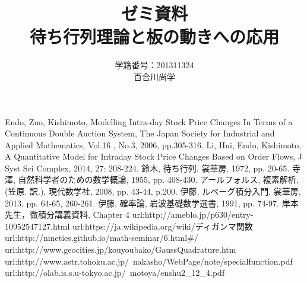 \documentclass[a4j,papersize,disablejfam,slide,14pt]{jsarticle}
\begin{document}
\title{\Huge ゼミ資料\\待ち行列理論と板の動きへの応用}
\author{\Large 学籍番号：201311324\\百合川尚学}
\maketitle

\tableofcontents

\begin{thebibliography}{9}
         {\rm Endo, Zuo, Kishimoto, 
        Modelling Intra-day Stock Price Changes In Terms of
        a Continuous Double Auction System, 
        The Japan Society for Industrial and Applied Mathematics, 
        Vol.16 , No.3, 2006, pp.305-316.}
         {\rm Li, Hui, Endo, Kishimoto, A Quantitative Model for Intraday Stock Price
         Changes Based on Order Flows, 
         J Syst Sci Complex, 2014, 27: 208-224.}
         {\rm 鈴木, 待ち行列, 裳華房, 1972, pp. 20-65.}
         {\rm 寺澤, 自然科学者のための数学概論, 1955, pp. 408-430.}
         {\rm アールフォルス, 複素解析, (笠原. 訳.), 現代数学社, 2008, pp. 43-44, p.200.}
         {\rm 伊藤, ルベーグ積分入門, 裳華房, 2013, pp. 64-65, 260-261.}
         {\rm 伊藤, 確率論, 岩波基礎数学選書, 1991, pp. 74-97.}
         {\rm 岸本先生，微積分講義資料, Chapter 4}
         {\rm url:http://ameblo.jp/p630/entry-10952547127.html}
         {\rm url:https://ja.wikipedia.org/wiki/ディガンマ関数}
         {\rm url:http://nineties.github.io/math-seminar/6.html#/}
         {\rm url:http://www.geocities.jp/kouyoubako/GaussQuadrature.htm}
         {\rm url:http://www.astr.tohoku.ac.jp/~nakasho/WebPage/note/specialfunction.pdf}
         {\rm url:http://olab.is.s.u-tokyo.ac.jp/~motoya/enshu2_12_4.pdf}
        
\end{thebibliography}
\end{document}
